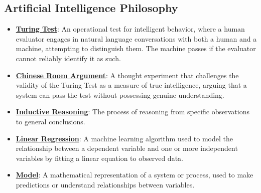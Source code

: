 \documentclass{article}%
\begin{document}
%
\subsection{Artificial Intelligence Philosophy}%
\label{subsec:ArtificialIntelligencePhilosophy}%
\begin{itemize}[leftmargin=*]%
\item \href{https://purdue.brightspace.com/d2l/common/assets/pdfjs-d2l-dist/1.0.14-legacy/web/viewer.html?file=\%2Fcontent\%2Fenforced\%2F1095467-wl.202510.CS.24300.001\%2F02L2-Intro.pdf\%3Fou\%3D1095467\&lang=en-us\&container=d2l-fileviewer-rendered-pdf\&fullscreen=d2l-fileviewer-rendered-pdf-dialog\&height=667#page=6}{\textbf{Turing Test}}: An operational test for intelligent behavior, where a human evaluator engages in natural language conversations with both a human and a machine, attempting to distinguish them. The machine passes if the evaluator cannot reliably identify it as such.%
\item \href{https://purdue.brightspace.com/d2l/common/assets/pdfjs-d2l-dist/1.0.14-legacy/web/viewer.html?file=\%2Fcontent\%2Fenforced\%2F1095467-wl.202510.CS.24300.001\%2F02L2-Intro.pdf\%3Fou\%3D1095467\&lang=en-us\&container=d2l-fileviewer-rendered-pdf\&fullscreen=d2l-fileviewer-rendered-pdf-dialog\&height=667#page=7}{\textbf{Chinese Room Argument}}: A thought experiment that challenges the validity of the Turing Test as a measure of true intelligence, arguing that a system can pass the test without possessing genuine understanding.%
\item \href{https://purdue.brightspace.com/d2l/common/assets/pdfjs-d2l-dist/1.0.14-legacy/web/viewer.html?file=\%2Fcontent\%2Fenforced\%2F1095467-wl.202510.CS.24300.001\%2F05L2-ML Basics.pdf\%3Fou\%3D1095467\&lang=en-us\&container=d2l-fileviewer-rendered-pdf\&fullscreen=d2l-fileviewer-rendered-pdf-dialog\&height=667#page=3}{\textbf{Inductive Reasoning}}: The process of reasoning from specific observations to general conclusions.%
\item \href{https://purdue.brightspace.com/d2l/common/assets/pdfjs-d2l-dist/1.0.14-legacy/web/viewer.html?file=\%2Fcontent\%2Fenforced\%2F1095467-wl.202510.CS.24300.001\%2F05L2-ML Basics.pdf\%3Fou\%3D1095467\&lang=en-us\&container=d2l-fileviewer-rendered-pdf\&fullscreen=d2l-fileviewer-rendered-pdf-dialog\&height=667#page=6}{\textbf{Linear Regression}}: A machine learning algorithm used to model the relationship between a dependent variable and one or more independent variables by fitting a linear equation to observed data.%
\item \href{https://purdue.brightspace.com/d2l/common/assets/pdfjs-d2l-dist/1.0.14-legacy/web/viewer.html?file=\%2Fcontent\%2Fenforced\%2F1095467-wl.202510.CS.24300.001\%2F05L2-ML Basics.pdf\%3Fou\%3D1095467\&lang=en-us\&container=d2l-fileviewer-rendered-pdf\&fullscreen=d2l-fileviewer-rendered-pdf-dialog\&height=667#page=5}{\textbf{Model}}: A mathematical representation of a system or process, used to make predictions or understand relationships between variables.%

\end{itemize}
\end{document}
